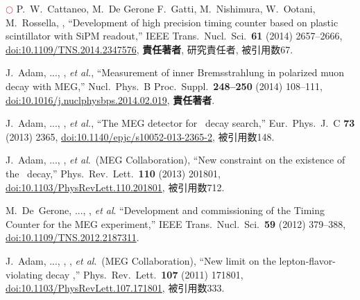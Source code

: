\begin{enumerate}
  \textcolor{red}{$\bigcirc$} 
  P.\ W.\ Cattaneo, M.\ De Gerone F.~Gatti, M.~Nishimura, W.~Ootani, M.~Rossella, \me, 
  ``Development of high precision timing counter based on plastic scintillator with SiPM readout,''
  IEEE Trans.\ Nucl.\ Sci.\ {\bf 61} (2014) 2657--2666,
  \href{http://dx.doi.org/10.1109/TNS.2014.2347576}{doi:10.1109/TNS.2014.2347576},
  \textbf{責任著者}, 研究責任者, 被引用数67.

  J.~Adam, ..., \me, {\it et al.},
  ``Measurement of inner Bremsstrahlung in polarized muon decay with MEG,''
  Nucl.\ Phys.\ B Proc.\ Suppl.\ \textbf{248--250} (2014) 108--111,
  \href{https://doi.org/10.1016/j.nuclphysbps.2014.02.019}{doi:10.1016/j.nuclphysbps.2014.02.019},
  \textbf{責任著者}.

  J.~Adam, ..., \me,  {\it et al.},
  ``The MEG detector for \megc\ decay search,''
  Eur.\ Phys.\ J.\ C {\bf 73} (2013) 2365,
  \href{https://doi.org/10.1140/epjc/s10052-013-2365-2}{doi:10.1140/epjc/s10052-013-2365-2}, 被引用数148.

  J.~Adam, ..., \me,  {\it et al}.\ (MEG Collaboration),
  ``New constraint on the existence of the \megc\ decay,''
  Phys.\ Rev.\ Lett.\  {\bf 110} (2013) 201801,
  \href{https://doi.org/10.1103/PhysRevLett.110.201801}{doi:10.1103/PhysRevLett.110.201801}, 被引用数712.


M.~De~Gerone, ..., \me, {\it et al}. %
``Development and commissioning of the Timing Counter for the MEG experiment,''
IEEE Trans.\ Nucl.\ Sci.\ \textbf{59} (2012) 379--388,
\href{http://dx.doi.org/10.1109/TNS.2012.2187311}{doi:10.1109/TNS.2012.2187311}.

J.~Adam, ..., \me, ,  {\it et al}.\ (MEG Collaboration),
``New limit on the lepton-flavor-violating decay \megc,''
Phys.\ Rev.\ Lett.\ \textbf{107} (2011) 171801,
\href{http://dx.doi.org/10.1103/PhysRevLett.107.171801}{doi:10.1103/PhysRevLett.107.171801}, 被引用数333.


\end{enumerate}
